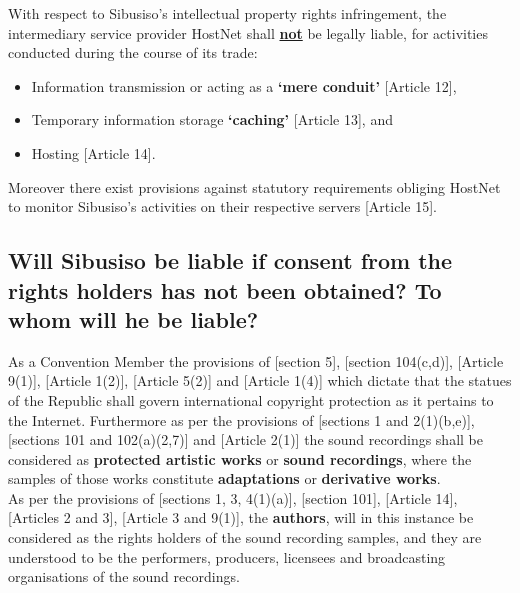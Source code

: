 \documentclass[11pt]{article}
\begin{document}
With respect to Sibusiso's intellectual property rights infringement, the
intermediary service provider HostNet shall \uline{\textbf{not}} be legally liable, for
activities conducted during the course of its trade:
\begin{itemize}
\item Information transmission or acting as a \textbf{`mere conduit'} [Article 12]\cite{eurlex00_elec_commerce},
\item Temporary information storage \textbf{`caching'} [Article 13]\cite{eurlex00_elec_commerce}, and
\item Hosting [Article 14]\cite{eurlex00_elec_commerce}.
\end{itemize}

Moreover there exist provisions against statutory requirements obliging HostNet
to monitor Sibusiso's activities on their respective servers [Article 15]\cite{eurlex00_elec_commerce}.


\subsection{Will Sibusiso be liable if consent from the rights holders has not been obtained? To whom will he be liable?}
\label{sec:org7af799c}

As a Convention Member the provisions of [section 5]\cite{rsa78_copyrightact},
[section 104(c,d)]\cite{usa76_title17_us_copyright_act}, [Article
9(1)]\cite{wto17_trips}, [Article 1(2)]\cite{eurlex00_elec_commerce}, [Article
5(2)]\cite{wipo86_berne} and [Article 1(4)]\cite{wipo96_copyright_treaty} which
dictate that the statues of the Republic shall govern international copyright
protection as it pertains to the Internet. Furthermore as per the provisions of
[sections 1 and 2(1)(b,e)]\cite{rsa78_copyrightact}, [sections 101 and
102(a)(2,7)]\cite{usa76_title17_us_copyright_act} and [Article
2(1)]\cite{wipo86_berne} the sound recordings shall be considered as \textbf{protected
artistic works} or \textbf{sound recordings}, where the samples of those works
constitute \textbf{adaptations} or \textbf{derivative works}.\\

As per the provisions of [sections 1, 3, 4(1)(a)]\cite{rsa78_copyrightact},
[section 101]\cite{usa76_title17_us_copyright_act}, [Article 14]\cite{wto17_trips},
[Articles 2 and 3]\cite{wipo96_wppt}, [Article 3 and 9(1)]\cite{wipo86_berne}, the
\textbf{authors}, will in this instance be considered as the rights holders of the
sound recording samples, and they are understood to be the performers,
producers, licensees and broadcasting organisations of the sound recordings.\\
\end{document}
